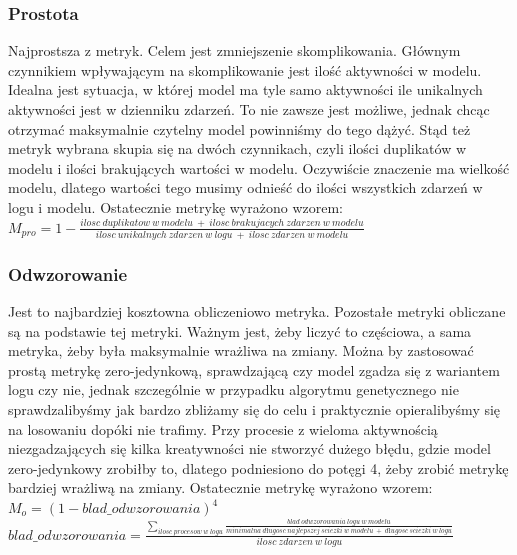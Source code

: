 \subsubsection{Prostota}  \cite{qd-in-discovery}
Najprostsza z metryk. Celem jest zmniejszenie skomplikowania. Głównym czynnikiem wpływającym na skomplikowanie jest ilość aktywności w modelu. Idealna jest sytuacja, w której model ma tyle samo aktywności ile unikalnych aktywności jest w dzienniku zdarzeń. To nie zawsze jest możliwe, jednak chcąc otrzymać maksymalnie czytelny model powinniśmy do tego dążyć. Stąd też metryk wybrana skupia się na dwóch czynnikach, czyli ilości duplikatów w modelu i ilości brakujących wartości w modelu. Oczywiście znaczenie ma wielkość modelu, dlatego wartości tego  musimy odnieść do ilości wszystkich zdarzeń w logu i modelu. Ostatecznie metrykę wyrażono wzorem: \newline
$M_{pro} = 1 - \frac{ilosc\ duplikatow\ w\ modelu\ +\ ilosc\ brakujacych\ zdarzen\ w\ modelu}{ilosc\ unikalnych\ zdarzen\ w\ logu\ +\ ilosc\ zdarzen\ w\ modelu}$
\subsubsection{Odwzorowanie} \cite{metric-calculation}
Jest to najbardziej kosztowna obliczeniowo metryka. Pozostałe metryki obliczane są na podstawie tej metryki. Ważnym jest, żeby liczyć to częściowa, a sama metryka, żeby była maksymalnie wrażliwa na zmiany. Można by zastosować prostą metrykę zero-jedynkową, sprawdzającą czy model zgadza się z wariantem logu czy nie, jednak szczególnie w przypadku algorytmu genetycznego nie sprawdzalibyśmy jak bardzo zbliżamy się do celu i praktycznie opieralibyśmy się na losowaniu dopóki nie trafimy. Przy procesie z wieloma aktywnością niezgadzających się kilka kreatywności nie stworzyć dużego błędu, gdzie model zero-jedynkowy zrobiłby to, dlatego podniesiono do potęgi 4, żeby zrobić metrykę bardziej wrażliwą na zmiany. Ostatecznie metrykę wyrażono wzorem: \newline
$M_o = (1 - blad\_odwzorowania)^4$ \newline
$blad\_odwzorowania = \frac{\sum_{ilosc\ procesow\ w\ logu} \frac{blad\ odwzorowania\ logu\ w\ modelu}{minimalna\ długosc\ najlepszej\ sciezki\ w\ modelu\ +\ długosc\ sciezki\ w\ logu}}{ilosc\ zdarzen \ w\ logu}$

